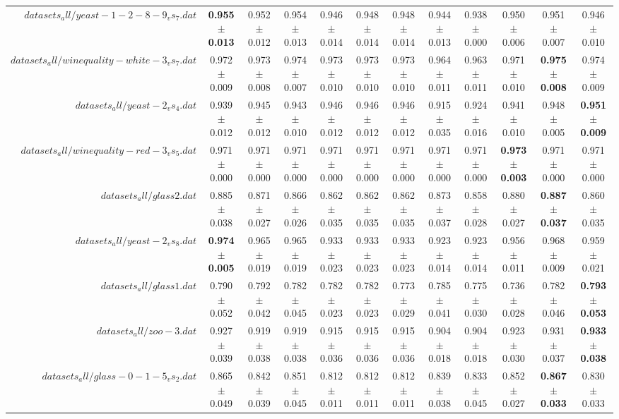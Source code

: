 \begin{table}[!ht]
{\begin{tabular}{r c c c c c c c c c c c}
$datasets_all/yeast-1-2-8-9_vs_7.dat$ & \textbf{0.955 $\pm$ 0.013} & 0.952 $\pm$ 0.012 & 0.954 $\pm$ 0.013 & 0.946 $\pm$ 0.014 & 0.948 $\pm$ 0.014 & 0.948 $\pm$ 0.014 & 0.944 $\pm$ 0.013 & 0.938 $\pm$ 0.000 & 0.950 $\pm$ 0.006 & 0.951 $\pm$ 0.007 & 0.946 $\pm$ 0.010 \\
$datasets_all/winequality-white-3_vs_7.dat$ & 0.972 $\pm$ 0.009 & 0.973 $\pm$ 0.008 & 0.974 $\pm$ 0.007 & 0.973 $\pm$ 0.010 & 0.973 $\pm$ 0.010 & 0.973 $\pm$ 0.010 & 0.964 $\pm$ 0.011 & 0.963 $\pm$ 0.011 & 0.971 $\pm$ 0.010 & \textbf{0.975 $\pm$ 0.008} & 0.974 $\pm$ 0.009 \\
$datasets_all/yeast-2_vs_4.dat$ & 0.939 $\pm$ 0.012 & 0.945 $\pm$ 0.012 & 0.943 $\pm$ 0.010 & 0.946 $\pm$ 0.012 & 0.946 $\pm$ 0.012 & 0.946 $\pm$ 0.012 & 0.915 $\pm$ 0.035 & 0.924 $\pm$ 0.016 & 0.941 $\pm$ 0.010 & 0.948 $\pm$ 0.005 & \textbf{0.951 $\pm$ 0.009} \\
$datasets_all/winequality-red-3_vs_5.dat$ & 0.971 $\pm$ 0.000 & 0.971 $\pm$ 0.000 & 0.971 $\pm$ 0.000 & 0.971 $\pm$ 0.000 & 0.971 $\pm$ 0.000 & 0.971 $\pm$ 0.000 & 0.971 $\pm$ 0.000 & 0.971 $\pm$ 0.000 & \textbf{0.973 $\pm$ 0.003} & 0.971 $\pm$ 0.000 & 0.971 $\pm$ 0.000 \\
$datasets_all/glass2.dat$ & 0.885 $\pm$ 0.038 & 0.871 $\pm$ 0.027 & 0.866 $\pm$ 0.026 & 0.862 $\pm$ 0.035 & 0.862 $\pm$ 0.035 & 0.862 $\pm$ 0.035 & 0.873 $\pm$ 0.037 & 0.858 $\pm$ 0.028 & 0.880 $\pm$ 0.027 & \textbf{0.887 $\pm$ 0.037} & 0.860 $\pm$ 0.035 \\
$datasets_all/yeast-2_vs_8.dat$ & \textbf{0.974 $\pm$ 0.005} & 0.965 $\pm$ 0.019 & 0.965 $\pm$ 0.019 & 0.933 $\pm$ 0.023 & 0.933 $\pm$ 0.023 & 0.933 $\pm$ 0.023 & 0.923 $\pm$ 0.014 & 0.923 $\pm$ 0.014 & 0.956 $\pm$ 0.011 & 0.968 $\pm$ 0.009 & 0.959 $\pm$ 0.021 \\
$datasets_all/glass1.dat$ & 0.790 $\pm$ 0.052 & 0.792 $\pm$ 0.042 & 0.782 $\pm$ 0.045 & 0.782 $\pm$ 0.023 & 0.782 $\pm$ 0.023 & 0.773 $\pm$ 0.029 & 0.785 $\pm$ 0.041 & 0.775 $\pm$ 0.030 & 0.736 $\pm$ 0.028 & 0.782 $\pm$ 0.046 & \textbf{0.793 $\pm$ 0.053} \\
$datasets_all/zoo-3.dat$ & 0.927 $\pm$ 0.039 & 0.919 $\pm$ 0.038 & 0.919 $\pm$ 0.038 & 0.915 $\pm$ 0.036 & 0.915 $\pm$ 0.036 & 0.915 $\pm$ 0.036 & 0.904 $\pm$ 0.018 & 0.904 $\pm$ 0.018 & 0.923 $\pm$ 0.030 & 0.931 $\pm$ 0.037 & \textbf{0.933 $\pm$ 0.038} \\
$datasets_all/glass-0-1-5_vs_2.dat$ & 0.865 $\pm$ 0.049 & 0.842 $\pm$ 0.039 & 0.851 $\pm$ 0.045 & 0.812 $\pm$ 0.011 & 0.812 $\pm$ 0.011 & 0.812 $\pm$ 0.011 & 0.839 $\pm$ 0.038 & 0.833 $\pm$ 0.045 & 0.852 $\pm$ 0.027 & \textbf{0.867 $\pm$ 0.033} & 0.830 $\pm$ 0.033 \\

\end{tabular}}
\end{table}
